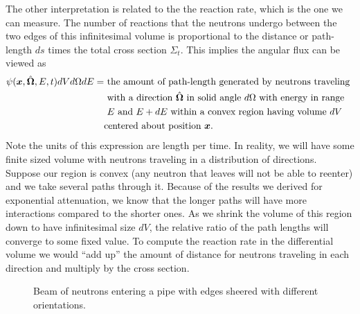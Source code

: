The other interpretation is related to the the reaction rate, which is the one we can measure. The number of reactions that the neutrons undergo between the two edges of this infinitesimal volume is proportional to the distance or path-length $ds$ times the total cross section $\Sigma_t$. This implies the angular flux can be viewed as
\begin{align}
  \psi(\bm{x},\hat{\mathbf{\Omega}},E,t) dV d\Omega dE 
  = &\text{ the amount of path-length generated by neutrons traveling } \nonumber \\*
   	&\text{ with a direction $\hat{\mathbf{\Omega}}$ in solid angle $d\Omega$ with energy in range } \nonumber \\*
   	&\text{ $E$ and $E + dE$ within a convex region having volume $dV$ } \nonumber \\*
   	&\text{centered about position $\bm{x}$.} \nonumber 
\end{align}
Note the units of this expression are length per time. In reality, we will have some finite sized volume with neutrons traveling in a distribution of directions. Suppose our region is convex (any neutron that leaves will not be able to reenter) and we take several paths through it. Because of the results we derived for exponential attenuation, we know that the longer paths will have more interactions compared to the shorter ones. As we shrink the volume of this region down to have infinitesimal size $dV$, the relative ratio of the path lengths will converge to some fixed value. To compute the reaction rate in the differential volume we would ``add up'' the amount of distance for neutrons traveling in each direction and multiply by the cross section.

\begin{figure}[tb!]
\begin{center}
\caption{Beam of neutrons entering a pipe with edges sheered with different orientations.}
\label{Fig:neutronics_neutronBeamAlongSheeredPipe}
\end{center}
\end{figure}

